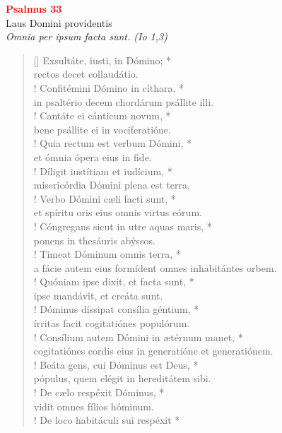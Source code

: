 \vspace{0.3cm}
\begin{center}
 \textcolor{red}{\large \bf Psalmus 33}\\
Laus Domini providentis\\
\textit{\small Omnia per ipsum facta sunt. (Io 1,3)}
\end{center}
\begin{verse}[\versewidth]
Exsultáte, iusti, in Dómino; *\\
rectos decet collaudátio.\\!
\vin Confitémini Dómino in cíthara, *\\
\vin in psaltério decem chordárum psállite illi.\\!
Cantáte ei cánticum novum, *\\
bene psállite ei in vociferatióne.\\!
\vin Quia rectum est verbum Dómini, *\\
\vin et ómnia ópera eius in fide.\\!
Díligit iustítiam et iudícium, *\\
misericórdia Dómini plena est terra.\\!
\vin Verbo Dómini cæli facti sunt, *\\
\vin et spíritu oris eius omnis virtus eórum.\\!
Cóngregans sicut in utre aquas maris, *\\
ponens in thesáuris abýssos.\\!
\vin Tímeat Dóminum omnis terra, *\\
\vin a fácie autem eius formídent omnes inhabitántes orbem.\\!
Quóniam ipse dixit, et facta sunt, *\\
ipse mandávit, et creáta sunt.\\!
\vin Dóminus díssipat consília géntium, *\\
\vin írritas facit cogitatiónes populórum.\\!
Consílium autem Dómini in ætérnum manet, *\\
cogitatiónes cordis eius in generatióne et generatiónem.\\!
\vin Beáta gens, cui Dóminus est Deus, *\\
\vin pópulus, quem elégit in hereditátem sibi.\\!
De cælo respéxit Dóminus, *\\
vidit omnes fílios hóminum.\\!
\vin De loco habitáculi sui respéxit *\\

\end{verse}
